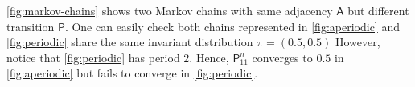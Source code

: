 \documentclass[a4paper]{article}
\begin{document}
\begin{remark}
	\autoref{fig:markov-chains} shows two Markov chains with same adjacency $\mathsf{A}$ but different transition $\mathsf{P}$.
	One can easily check both chains represented in \autoref{fig:aperiodic} and \autoref{fig:periodic}
	share the same invariant distribution $\pi=(0.5,0.5)$
	However, notice that \autoref{fig:periodic} has period $2$.
	Hence, $\mathsf{P}_{11}^{n}$ converges to $0.5$ in \autoref{fig:aperiodic} but fails to converge in \autoref{fig:periodic}.
\end{remark}

\printglossaries
\printbibliography
\end{document}
